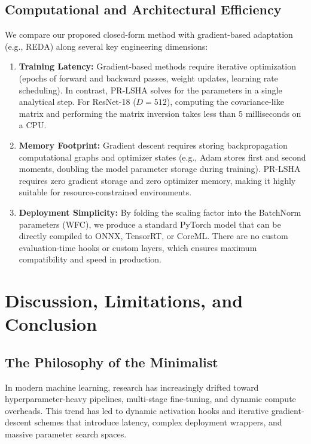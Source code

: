 \documentclass{article}
\theoremstyle{plain}
\theoremstyle{definition}
\theoremstyle{remark}
\begin{document}
\subsection{Computational and Architectural Efficiency}
\label{sec:efficiency}

We compare our proposed closed-form method with gradient-based adaptation (e.g., REDA) along several key engineering dimensions:

\begin{enumerate}
    \item \textbf{Training Latency:} Gradient-based methods require iterative optimization (epochs of forward and backward passes, weight updates, learning rate scheduling). In contrast, PR-LSHA solves for the parameters in a single analytical step. For ResNet-18 ($D=512$), computing the covariance-like matrix and performing the matrix inversion takes less than 5 milliseconds on a CPU.
    \item \textbf{Memory Footprint:} Gradient descent requires storing backpropagation computational graphs and optimizer states (e.g., Adam stores first and second moments, doubling the model parameter storage during training). PR-LSHA requires zero gradient storage and zero optimizer memory, making it highly suitable for resource-constrained environments.
    \item \textbf{Deployment Simplicity:} By folding the scaling factor into the BatchNorm parameters (WFC), we produce a standard PyTorch model that can be directly compiled to ONNX, TensorRT, or CoreML. There are no custom evaluation-time hooks or custom layers, which ensures maximum compatibility and speed in production.
\end{enumerate}

\section{Discussion, Limitations, and Conclusion}
\label{sec:conclusion}

\subsection{The Philosophy of the Minimalist}
\label{sec:philosophy}
In modern machine learning, research has increasingly drifted toward hyperparameter-heavy pipelines, multi-stage fine-tuning, and dynamic compute overheads. This trend has led to dynamic activation hooks and iterative gradient-descent schemes that introduce latency, complex deployment wrappers, and massive parameter search spaces. 
\end{document}
